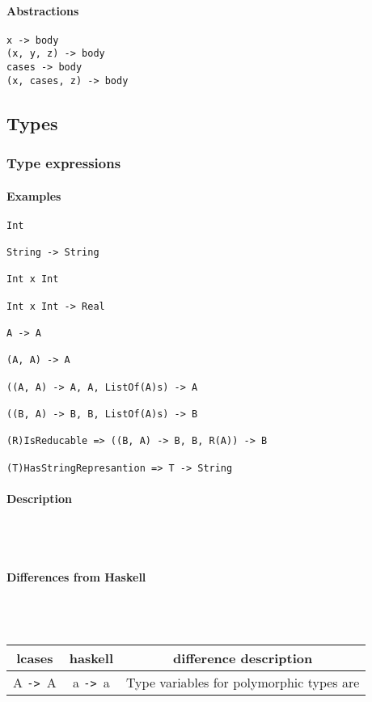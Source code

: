 \documentclass{article}
\def\ra{\texttt{->}\ }
\def\pend{\mbox{} \\\\}
\begin{document}
\paragraph{Abstractions}

\begin{verbatim}
x -> body
(x, y, z) -> body
cases -> body
(x, cases, z) -> body
\end{verbatim}

\subsection{Types}

\subsubsection{Type expressions}

\paragraph{Examples}

\begin{verbatim}
Int

String -> String 

Int x Int 

Int x Int -> Real

A -> A

(A, A) -> A

((A, A) -> A, A, ListOf(A)s) -> A

((B, A) -> B, B, ListOf(A)s) -> B

(R)IsReducable => ((B, A) -> B, B, R(A)) -> B

(T)HasStringRepresantion => T -> String
\end{verbatim}

\paragraph{Description}\pend

\paragraph{Differences from Haskell}\pend
\begin{tabular}{ |c|c|c| } 
\hline
lcases & haskell & difference description \\ 
\hline
\hline
A \ra A & a \ra a & Type variables for polymorphic types are  \\ 
\hline
\end{tabular}
\end{document}
